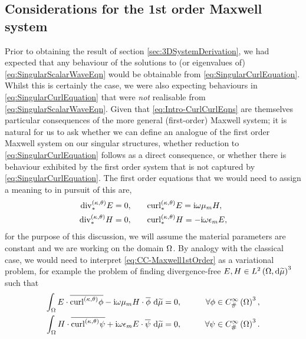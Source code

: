 \subsection{Considerations for the 1st order Maxwell system} \label{ssec:CC-1stOrderMaxwell}
Prior to obtaining the result of section \ref{sec:3DSystemDerivation}, we had expected that any behaviour of the solutions to (or eigenvalues of) \eqref{eq:SingularScalarWaveEqn} would be obtainable from \eqref{eq:SingularCurlEquation}.
Whilst this is certainly the case, we were also expecting behaviours in \eqref{eq:SingularCurlEquation} that were \emph{not} realisable from \eqref{eq:SingularScalarWaveEqn}.
Given that \eqref{eq:Intro-CurlCurlEqns} are themselves particular consequences of the more general (first-order) Maxwell system; it is natural for us to ask whether we can define an analogue of the first order Maxwell system on our singular structures, whether reduction to \eqref{eq:SingularCurlEquation} follows as a direct consequence, or whether there is behaviour exhibited by the first order system that is not captured by \eqref{eq:SingularCurlEquation}.
The first order equations that we would need to assign a meaning to in pursuit of this are,
\begin{subequations} \label{eq:CC-Maxwell1stOrder}
	\begin{align}
		\mathrm{div}_{*}^{\left( \kappa, \theta \right)} E = 0,
		&\qquad
		\mathrm{curl}_{*}^{\left( \kappa, \theta \right)}E = \mathrm{i}\omega\mu_m H, \label{eq:CC-Maxwell1stOrderCurlE} \\
		\mathrm{div}_{*}^{\left( \kappa, \theta \right)} H = 0,
		&\qquad
		\mathrm{curl}_{*}^{\left( \kappa, \theta \right)}H = -\mathrm{i}\omega\epsilon_m E, \label{eq:CC-Maxwell1stOrderCurlH}
	\end{align}
\end{subequations}
for the purpose of this discussion, we will assume the material parameters are constant and we are working on the domain $\Omega$.
By analogy with the classical case, we would need to interpret \eqref{eq:CC-Maxwell1stOrder} as a variational problem, for example the problem of finding divergence-free $E,H\in L^{2}\left( \Omega,\mathrm{d} \widetilde{\mu} \right)^3$ such that
\begin{subequations} \label{eq:CC-Maxwell1stOrderVariational}
	\begin{align} 
		\int_{\Omega} E\cdot\overline{\mathrm{curl}_{}^{\left( \kappa, \theta \right)}\phi} - \mathrm{i}\omega\mu_m H\cdot\overline{\phi}  \ \mathrm{d}\widetilde{\mu} &= 0, 
		\qquad &\forall \phi\in C^{\infty}_{\#}\left( \Omega \right)^3, \\
		\int_{\Omega} H\cdot\overline{\mathrm{curl}_{}^{\left( \kappa, \theta \right)}\psi} + \mathrm{i}\omega\epsilon_m E\cdot\overline{\psi}  \ \mathrm{d}\widetilde{\mu} &= 0,
		\qquad &\forall \psi\in C^{\infty}_{\#}\left( \Omega \right)^3.
	\end{align}
\end{subequations}
